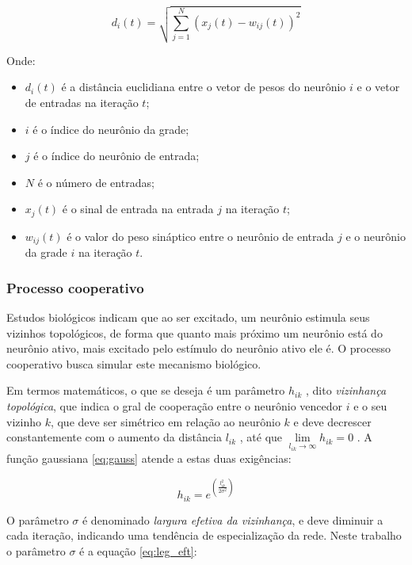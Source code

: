 \begin{equation}\label{eq:dit_ecl}
d_i(t) = \sqrt{\sum_{j = 1}^N \left( x_j(t) - w_{ij}(t) \right)^2}
\end{equation}

Onde:

\begin{itemize}
\item $ d_i(t) $ é a distância euclidiana entre o vetor de pesos do
neurônio $ i $ e o vetor de entradas na iteração $ t $;
\item $ i $ é o índice do neurônio da grade;
\item $ j $ é o índice do neurônio de entrada;
\item $ N $ é o número de entradas;
\item $ x_j(t) $ é o sinal de entrada na entrada $ j $ na iteração $ t $;
\item $ w_{ij}(t) $ é o valor do peso sináptico entre o neurônio de
entrada $ j $ e o neurônio da grade $ i $ na iteração $ t $.
\end{itemize}

\subsubsection{Processo cooperativo}

Estudos biológicos indicam que ao ser excitado, um neurônio estimula seus
vizinhos topológicos, de forma que quanto mais próximo um neurônio está do
neurônio ativo, mais excitado pelo estímulo do neurônio ativo ele é. O processo
cooperativo busca simular este mecanismo biológico.

Em termos matemáticos, o que se deseja é um parâmetro $ h_{ik} $ , dito
\textit{vizinhança topológica}, que indica o gral de cooperação entre o
neurônio vencedor $ i $ e o seu vizinho $ k $, que deve ser simétrico em relação
ao neurônio $ k $ e deve decrescer constantemente com o aumento da
distância $ l_{ik} $ , até que $ \lim\limits_{ l_{ik} \to \infty } h_{ik} = 0 $ .
A função gaussiana \ref{eq:gauss} atende a estas duas exigências:

\begin{equation}\label{eq:gauss}
h_{ik} = e^{ \left( \frac{ l_{ik}^2 }{ 2 \sigma^2 } \right) }
\end{equation}

O parâmetro $ \sigma $ é denominado \textit{largura efetiva da vizinhança},
e deve diminuir a cada iteração, indicando uma tendência de especialização da
rede. Neste trabalho o parâmetro $ \sigma $ é a equação \ref{eq:leg_eft}:

